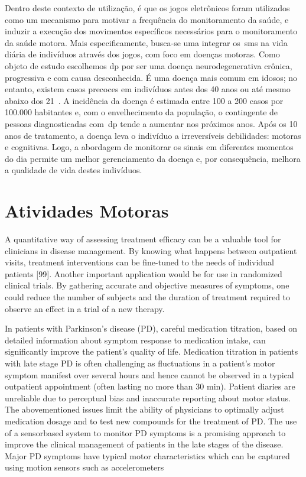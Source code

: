 Dentro deste contexto de utilização, é que os jogos eletrônicos foram utilizados como um mecanismo para motivar a frequência do monitoramento da saúde, e induzir a execução dos movimentos específicos necessários para o monitoramento da saúde motora. Mais especificamente, busca-se uma integrar os~\ac{sms} na vida diária de indivíduos através dos jogos, com foco em doenças motoras. Como objeto de estudo escolhemos \ac{dp} por ser uma doença neurodegenerativa crônica, progressiva e com causa desconhecida. É uma doença mais comum em idosos; no entanto, existem casos precoces em indivíduos antes dos 40 anos ou até mesmo abaixo dos 21~\cite{menezes2003}. A incidência da doença é estimada entre 100 a 200 casos por 100.000 habitantes e, com o envelhecimento da população, o contingente de pessoas diagnosticadas com~\ac{dp} tende a aumentar nos próximos anos. Após os 10 anos de tratamento, a doença leva o indivíduo a irreversíveis debilidades: motoras e cognitivas. Logo, a abordagem de monitorar os sinais em diferentes momentos do dia permite um melhor gerenciamento da doença e, por consequência, melhora a qualidade de vida destes indivíduos.

\section{Atividades Motoras} 

A quantitative way of assessing treatment efficacy can be
a valuable tool for clinicians in disease management. By
knowing what happens between outpatient visits, treatment
interventions can be fine-tuned to the needs of
individual patients [99]. Another important application
would be for use in randomized clinical trials. By gathering
accurate and objective measures of symptoms, one
could reduce the number of subjects and the duration
of treatment required to observe an effect in a trial of a
new therapy.
~\cite{patel2012}

In patients with Parkinson’s disease (PD), careful medication
titration, based on detailed information about
symptom response to medication intake, can significantly
improve the patient’s quality of life. Medication titration in
patients with late stage PD is often challenging as fluctuations
in a patient’s motor symptom manifest over several
hours and hence cannot be observed in a typical outpatient
appointment (often lasting no more than 30 min).
Patient diaries are unreliable due to perceptual bias and
inaccurate reporting about motor status. The abovementioned
issues limit the ability of physicians to optimally
adjust medication dosage and to test new
compounds for the treatment of PD. The use of a sensorbased
system to monitor PD symptoms is a promising
approach to improve the clinical management of patients
in the late stages of the disease. Major PD symptoms have
typical motor characteristics which can be captured using
motion sensors such as accelerometers
~\cite{patel2012}


